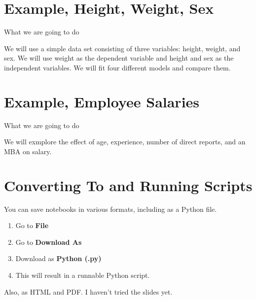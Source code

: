 \documentclass{beamer}
\begin{document}
\section{Example, Height, Weight, Sex}

\begin{frame}
    \LARGE What we are going to do

    \normalsize
We will use a simple data set consisting of three variables: height, weight, and sex. We will use weight as the dependent variable and height and sex as the independent variables. We will fit four different models and compare them. 
\end{frame}

\section{Example, Employee Salaries}

\begin{frame}
    \LARGE What we are going to do

    \normalsize
    We will exmplore the effect of age, experience, number of direct reports, and an MBA on salary.
    
\end{frame}

\section{Converting To and Running Scripts}

    You can save notebooks in various formats, including as a Python file.

    \begin{enumerate}
            \setlength\itemsep{1em}
        \item Go to \textbf{File}
        \item Go to \textbf{Download As}
        \item Download as \textbf{Python (.py)}
        \item This will result in a runnable Python script.
    \end{enumerate}

    Also, as HTML and PDF. I haven't tried the slides yet.
\end{document}
